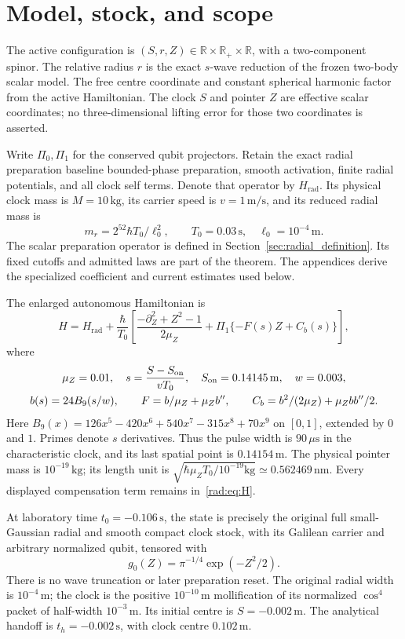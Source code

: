 \documentclass[11pt]{article}
\theoremstyle{definition}\newtheorem{definition}[theorem]{Definition}
\theoremstyle{remark}\newtheorem{remark}[theorem]{Remark}
\begin{document}
\section{Model, stock, and scope}

The active configuration is $(S,r,Z)\in\mathbb R\times\mathbb R_+\times
\mathbb R$, with a two-component spinor. The relative radius $r$ is the
exact $s$-wave reduction of the frozen two-body scalar model. The free
centre coordinate and constant spherical harmonic factor from the active
Hamiltonian. The clock $S$ and pointer $Z$ are effective scalar coordinates;
no three-dimensional lifting error for those two coordinates is asserted.

Write $\Pi_0,\Pi_1$ for the conserved qubit projectors. Retain the exact
radial preparation baseline bounded-phase preparation, smooth activation, finite radial
potentials, and all clock self terms. Denote that operator by
$H_{\mathrm{rad}}$. Its physical clock mass is $M=10\,\mathrm{kg}$, its carrier speed
is $v=1\,\mathrm{m/s}$, and its reduced radial mass is
\[
 m_r=2^{52}\hbar T_0/\ell_0^2,\qquad
 T_0=0.03\,\mathrm{s},\quad \ell_0=10^{-4}\,\mathrm m.
\]
The scalar preparation operator is defined in Section~\ref{sec:radial_definition}.
Its fixed cutoffs and admitted laws are part of the theorem. The appendices derive the specialized coefficient and current estimates
used below.

The enlarged autonomous Hamiltonian is
\begin{equation}\label{rad:eq:H}
 H=H_{\mathrm{rad}}+\frac{\hbar}{T_0}
 \left[\frac{-\partial_Z^2+Z^2-1}{2\mu_Z}
              +\Pi_1\{-F(s)Z+C_b(s)\}\right],
\end{equation}
where
\begin{gather*}
 \mu_Z=0.01,\quad s=\frac{S-S_{\rm on}}{vT_0},\quad
 S_{\rm on}=0.14145\,\mathrm m,\quad w=0.003,\\
 b(s)=24 B_9(s/w),\qquad
 F=b/\mu_Z+\mu_Z b'',\qquad
 C_b=b^2/(2\mu_Z)+\mu_Z b b''/2.
\end{gather*}
Here $B_9(x)=126x^5-420x^6+540x^7-315x^8+70x^9$ on $[0,1]$,
extended by $0$ and $1$. Primes denote $s$ derivatives. Thus the pulse
width is $90\,\mu\mathrm s$ in the characteristic clock, and its last
spatial point is $0.14154\,\mathrm m$. The physical pointer mass is
$10^{-19}\,\mathrm{kg}$; its length unit is
$\sqrt{\hbar\mu_Z T_0/10^{-19}\mathrm{kg}}\simeq0.562469\,\mathrm{nm}$.
Every displayed compensation term remains in~\eqref{rad:eq:H}.

At laboratory time $t_0=-0.106\,\mathrm s$, the state is precisely the
original full small-Gaussian radial and smooth compact clock stock,
with its Galilean carrier and arbitrary normalized qubit, tensored with
\[
 g_0(Z)=\pi^{-1/4}\exp(-Z^2/2).
\]
There is no wave truncation or later preparation reset. The original
radial width is $10^{-4}\,\mathrm m$; the clock is the positive
$10^{-10}\,\mathrm m$ mollification of its normalized $\cos^4$ packet
of half-width $10^{-3}\,\mathrm m$. Its initial centre is
$S=-0.002\,\mathrm m$. The analytical handoff is
$t_h=-0.002\,\mathrm s$, with clock centre $0.102\,\mathrm m$.
\end{document}
